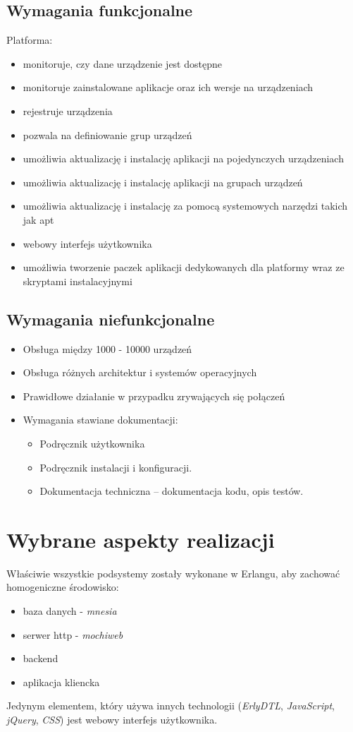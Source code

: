 \documentclass[polish,12pt]{aghthesis}
\begin{document}
\subsection{Wymagania funkcjonalne}
Platforma:
\begin{itemize}
  \item monitoruje, czy dane urządzenie jest dostępne
  \item monitoruje zainstalowane aplikacje oraz ich wersje na urządzeniach
  \item rejestruje urządzenia
  \item pozwala na definiowanie grup urządzeń
  \item umożliwia aktualizację i instalację aplikacji na pojedynczych urządzeniach
  \item umożliwia aktualizację i instalację aplikacji na grupach urządzeń
  \item umożliwia aktualizację i instalację za pomocą systemowych narzędzi takich jak apt
  \item webowy interfejs użytkownika
  \item umożliwia tworzenie paczek aplikacji dedykowanych dla platformy wraz ze skryptami instalacyjnymi
\end{itemize}
\subsection{Wymagania niefunkcjonalne}
\begin{itemize}
  \item Obsługa między 1000 - 10000 urządzeń
  \item Obsługa różnych architektur i systemów operacyjnych
  \item Prawidłowe działanie w przypadku zrywających się połączeń
  \item Wymagania stawiane dokumentacji:
    \begin{itemize}
      \item Podręcznik użytkownika
      \item Podręcznik instalacji i konfiguracji.
      \item Dokumentacja techniczna – dokumentacja kodu, opis testów.
    \end{itemize}
\end{itemize}

\section{Wybrane aspekty realizacji}
Właściwie wszystkie podsystemy zostały wykonane w Erlangu, aby zachować homogeniczne środowisko:
\begin{itemize}
  \item baza danych - \emph{mnesia}
  \item serwer http - \emph{mochiweb}
  \item backend
  \item aplikacja kliencka
\end{itemize}
Jedynym elementem, który używa innych technologii (\emph{ErlyDTL}, \emph{JavaScript}, \emph{jQuery}, \emph{CSS}) jest webowy interfejs użytkownika.
\end{document}
